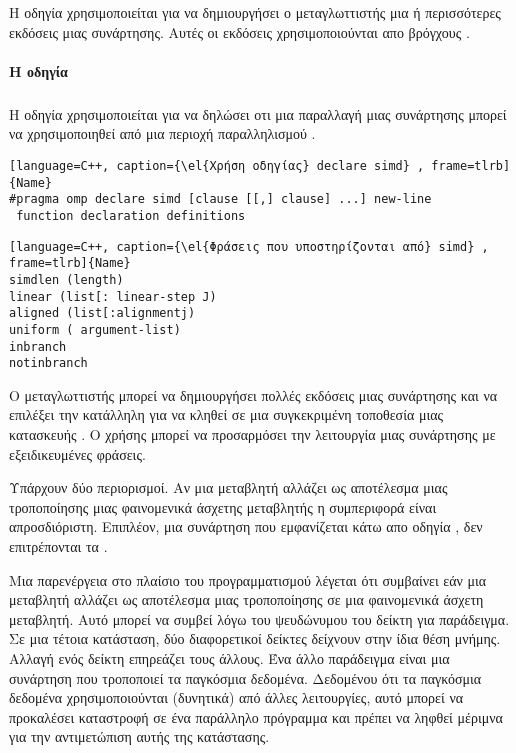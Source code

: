Η οδηγία \emph{} χρησιμοποιείται για να δημιουργήσει ο μεταγλωττιστής μια ή περισσότερες \emph{} εκδόσεις μιας συνάρτησης. Αυτές οι εκδόσεις χρησιμοποιούνται απο βρόγχους \emph{}.



\paragraph{H οδηγία \emph{}}
\subparagraph{}
Η οδηγία \emph{} χρησιμοποιείται για να δηλώσει οτι μια \emph{} παραλλαγή μιας συνάρτησης μπορεί να χρησιμοποιηθεί από μια περιοχή παραλληλισμού \emph{}.

\begin{lstlisting}[language=C++, caption={\el{Χρήση οδηγίας} declare simd} , frame=tlrb]{Name}
#pragma omp declare simd [clause [[,] clause] ...] new-line
 function declaration definitions
\end{lstlisting}

\begin{lstlisting}[language=C++, caption={\el{Φράσεις που υποστηρίζονται από} simd} , frame=tlrb]{Name}
simdlen (length)
linear (list[: linear-step J)
aligned (list[:alignmentj)
uniform ( argument-list)
inbranch
notinbranch
\end{lstlisting}

Ο μεταγλωττιστής μπορεί να δημιουργήσει πολλές εκδόσεις μιας συνάρτησης \emph{} και να επιλέξει την κατάλληλη για να κληθεί σε μια συγκεκριμένη τοποθεσία μιας κατασκευής \emph{}. Ο χρήσης μπορεί να προσαρμόσει την λειτουργία μιας συνάρτησης με εξειδικευμένες φράσεις.

Υπάρχουν δύο περιορισμοί. Αν μια μεταβλητή αλλάζει ως αποτέλεσμα μιας τροποποίησης μιας φαινομενικά άσχετης μεταβλητής η συμπεριφορά είναι απροσδιόριστη. Επιπλέον, μια συνάρτηση που εμφανίζεται κάτω απο οδηγία \emph{}, δεν επιτρέπονται τα \emph{}.



Μια παρενέργεια στο πλαίσιο του προγραμματισμού λέγεται ότι συμβαίνει εάν μια μεταβλητή
αλλάζει ως αποτέλεσμα μιας τροποποίησης σε μια φαινομενικά άσχετη μεταβλητή. Αυτό
μπορεί να συμβεί λόγω του ψευδώνυμου του δείκτη για παράδειγμα. Σε μια τέτοια κατάσταση, δύο
διαφορετικοί δείκτες δείχνουν στην ίδια θέση μνήμης. Αλλαγή ενός δείκτη
επηρεάζει τους άλλους. Ένα άλλο παράδειγμα είναι μια συνάρτηση που τροποποιεί τα παγκόσμια δεδομένα.
Δεδομένου ότι τα παγκόσμια δεδομένα χρησιμοποιούνται (δυνητικά) από άλλες λειτουργίες, αυτό μπορεί να προκαλέσει καταστροφή
σε ένα παράλληλο πρόγραμμα και πρέπει να ληφθεί μέριμνα για την αντιμετώπιση αυτής της κατάστασης.


